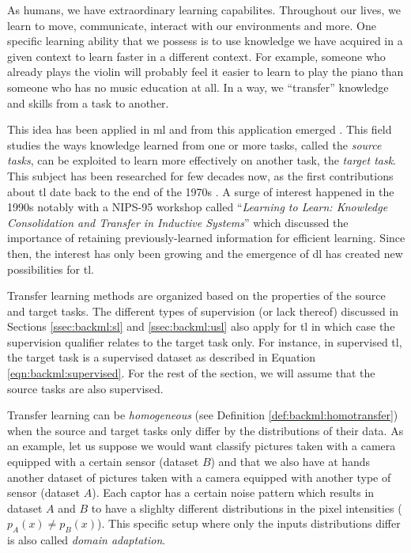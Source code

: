 As humans, we have extraordinary learning capabilites. Throughout our lives, we learn to move, communicate, interact with our environments and more. One specific learning ability that we possess is to use knowledge we have acquired in a given context to learn faster in a different context. For example, someone who already plays the violin will probably feel it easier to learn to play the piano than someone who has no music education at all. In a way, we ``transfer'' knowledge and skills from a task to another. 

This idea has been applied in \acrlong{ml} and from this application emerged  \parencite{yang2020transfer}. This field studies the ways knowledge learned from one or more tasks, called the \textit{source tasks}, can be exploited to learn more effectively on another task, the \textit{target task}. This subject has been researched for few decades now, as the first contributions about \acrlong{tl} date back to the end of the 1970s \parencite{bozinovski2020reminder}. A surge of interest happened in the 1990s notably with a NIPS-95 workshop called ``\textit{Learning to Learn: Knowledge Consolidation and Transfer in Inductive Systems}'' which discussed the importance of retaining previously-learned information for efficient learning. Since then, the interest has only been growing and the emergence of \acrlong{dl} has created new possibilities for \acrlong{tl}. 

Transfer learning methods are organized based on the properties of the source and target tasks. The different types of supervision (or lack thereof) discussed in Sections \ref{ssec:backml:sl} and \ref{ssec:backml:usl} also apply for \acrlong{tl} in which case the supervision qualifier relates to the target task only. For instance, in supervised \acrlong{tl}, the target task is a supervised dataset as described in Equation \ref{eqn:backml:supervised}. For the rest of the section, we will assume that the source tasks are also supervised. 

Transfer learning can be \textit{homogeneous} (see Definition \ref{def:backml:homotransfer}) when the source and target tasks only differ by the distributions of their data. As an example, let us suppose we would want classify pictures taken with a camera equipped with a certain sensor (dataset $B$) and that we also have at hands another dataset of pictures taken with a camera equipped with another type of sensor (dataset $A$). Each captor has a certain noise pattern which results in dataset $A$ and $B$ to have a slighlty different distributions in the pixel intensities (\ie $p_A(x) \neq p_B(x)$). This specific setup where only the inputs distributions differ is also called \textit{domain adaptation}.  


